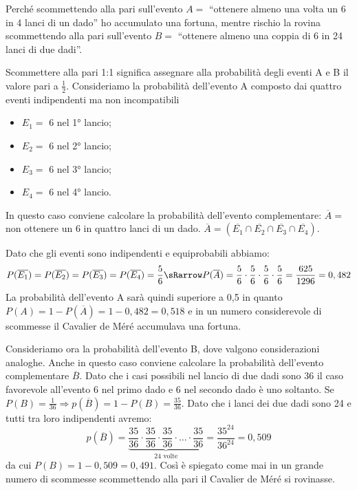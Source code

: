 \begin{problema}
Perché scommettendo alla pari sull'evento \( A= \) ``ottenere almeno una 
volta un 6 in 4 lanci di un dado'' ho accumulato una fortuna, mentre rischio 
la rovina scommettendo alla pari sull'evento \( B= \) ``ottenere almeno una 
coppia di 6 in 24 lanci di due dadi''.
\end{problema}
Scommettere alla pari 1:1 significa assegnare alla probabilità degli eventi 
A e 
B il valore pari a \(\frac 1 2\).
Consideriamo la probabilità dell'evento A composto dai quattro eventi 
indipendenti ma non incompatibili
\begin{multicols}{2}
\begin{itemize} [nosep]

\item \( E_1= \)  6 nel 1° lancio;
\item \( E_{2}= \)  6 nel 2° lancio;
\item \( E_{3}= \)  6 nel 3° lancio;
\item \( E_{4}= \)  6 nel 4° lancio.
\end{itemize}
\end{multicols}
In questo caso conviene calcolare la probabilità dell'evento complementare: 
\(\overline A=\) non ottenere un 6 in quattro lanci di un dado.
\(\overline A=(\overline{E_1}\cap \overline{E_2}\cap \overline{E_3}\cap 
\overline{E_4})\).

Dato che gli eventi sono indipendenti e equiprobabili abbiamo: 
\[P(\overline{E_1})=P(\overline{E_2})=P(\overline{E_3})=P(\overline{E_4})=
  \frac{5}{6} \sRarrow 
  P(\overline A)=\frac 5 6\cdot \frac 5 6\cdot \frac 5 6\cdot \frac 5 6=
  \frac{625}{1296} = 0,482\] 
La probabilità dell'evento A sarà quindi superiore a 0,5 in quanto 
\(P(A)=1-P(\overline A)=1-0,482=0,518\) e in un numero considerevole di 
scommesse il Cavalier de Méré accumulava una fortuna.

Consideriamo ora la probabilità dell'evento B, dove valgono considerazioni 
analoghe. Anche in questo caso conviene calcolare la probabilità 
dell'evento complementare \(\overline B\). 
Dato che i casi possibili nel lancio di due 
dadi sono 36 il caso favorevole all'evento 6 nel primo dado e 6 nel secondo 
dado è uno soltanto. 
Se \(P(B)=\frac 1{36} \Rightarrow p(\overline B)=1-P(B)=\frac{35}{36}\). 
Dato che i lanci dei due dadi sono 24 e tutti tra 
loro indipendenti avremo:
 \[ p(\overline 
B)=\underbrace{\frac{35}{36}\cdot\frac{35}{36}\cdot\frac{35}{36}
\cdot\ldots\cdot\frac{35}{36}}_{24\text{ 
volte}}=\frac{35^{24}}{36^{24}}=0,509 
\]
 da cui \(P(B)=1-0,509=0,491\). Così è spiegato come mai in un grande numero 
di scommesse scommettendo alla pari il Cavalier de Méré si rovinasse.

